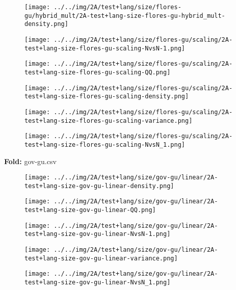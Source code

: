 \begin{figure}[H]
\centering	\texttt{[image: ../../img/2A/test+lang/size/flores-gu/hybrid\_mult/2A-test+lang-size-flores-gu-hybrid\_mult-density.png]}
\end{figure}
\begin{figure}[H]
\centering	\texttt{[image: ../../img/2A/test+lang/size/flores-gu/scaling/2A-test+lang-size-flores-gu-scaling-NvsN-1.png]}
\end{figure}
\begin{figure}[H]
\centering	\texttt{[image: ../../img/2A/test+lang/size/flores-gu/scaling/2A-test+lang-size-flores-gu-scaling-QQ.png]}
\end{figure}
\begin{figure}[H]
\centering	\texttt{[image: ../../img/2A/test+lang/size/flores-gu/scaling/2A-test+lang-size-flores-gu-scaling-density.png]}
\end{figure}
\begin{figure}[H]
\centering	\texttt{[image: ../../img/2A/test+lang/size/flores-gu/scaling/2A-test+lang-size-flores-gu-scaling-variance.png]}
\end{figure}
\begin{figure}[H]
\centering	\texttt{[image: ../../img/2A/test+lang/size/flores-gu/scaling/2A-test+lang-size-flores-gu-scaling-NvsN\_1.png]}
\end{figure}
\textbf{Fold:} gov-gu.csv
\begin{figure}[H]
\centering	\texttt{[image: ../../img/2A/test+lang/size/gov-gu/linear/2A-test+lang-size-gov-gu-linear-density.png]}
\end{figure}
\begin{figure}[H]
\centering	\texttt{[image: ../../img/2A/test+lang/size/gov-gu/linear/2A-test+lang-size-gov-gu-linear-QQ.png]}
\end{figure}
\begin{figure}[H]
\centering	\texttt{[image: ../../img/2A/test+lang/size/gov-gu/linear/2A-test+lang-size-gov-gu-linear-NvsN-1.png]}
\end{figure}
\begin{figure}[H]
\centering	\texttt{[image: ../../img/2A/test+lang/size/gov-gu/linear/2A-test+lang-size-gov-gu-linear-variance.png]}
\end{figure}
\begin{figure}[H]
\centering	\texttt{[image: ../../img/2A/test+lang/size/gov-gu/linear/2A-test+lang-size-gov-gu-linear-NvsN\_1.png]}
\end{figure}
